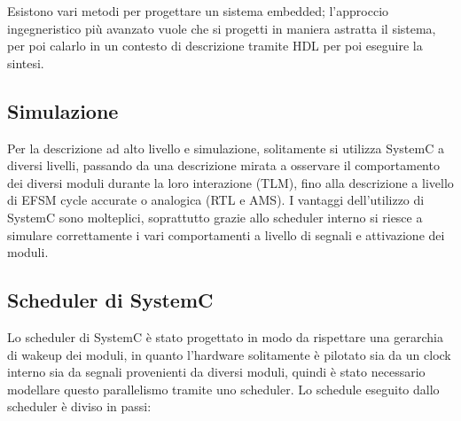 \documentclass[11pt]{article} %
\begin{document}
Esistono vari metodi per progettare un sistema embedded; l'approccio ingegneristico più avanzato vuole che si progetti in maniera astratta il sistema, per poi calarlo in un contesto di descrizione tramite HDL per poi eseguire la sintesi.

\subsection{Simulazione}

Per la descrizione ad alto livello e simulazione, solitamente si utilizza SystemC a diversi livelli, passando da una descrizione mirata a osservare il comportamento dei diversi moduli durante la loro interazione (TLM), fino alla descrizione a livello di EFSM cycle accurate o analogica (RTL e AMS). I vantaggi dell'utilizzo di SystemC sono molteplici, soprattutto grazie allo scheduler interno si riesce a simulare correttamente i vari comportamenti a livello di segnali e attivazione dei moduli.

\subsection{Scheduler di SystemC}

Lo scheduler di SystemC è stato progettato in modo da rispettare una gerarchia di wakeup dei moduli, in quanto l'hardware solitamente è pilotato sia da un clock interno sia da segnali provenienti da diversi moduli, quindi è stato necessario modellare questo parallelismo tramite uno scheduler. Lo schedule eseguito dallo scheduler è diviso in passi:
\end{document}
